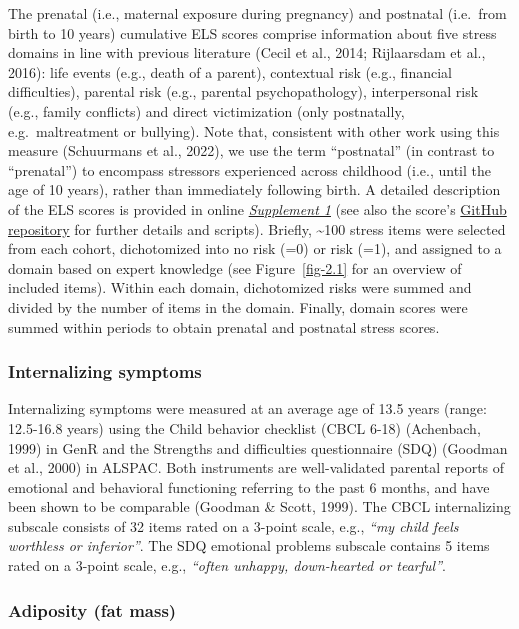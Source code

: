 \documentclass[
  letterpaper,
  DIV=11,
  numbers=noendperiod]{scrreport}
\begin{document}
The prenatal (i.e., maternal exposure during pregnancy) and postnatal
(i.e.~from birth to 10 years) cumulative ELS scores comprise information
about five stress domains in line with previous literature (Cecil et
al., 2014; Rijlaarsdam et al., 2016): life events (e.g., death of a
parent), contextual risk (e.g., financial difficulties), parental risk
(e.g., parental psychopathology), interpersonal risk (e.g., family
conflicts) and direct victimization (only postnatally, e.g.~maltreatment
or bullying). Note that, consistent with other work using this measure
(Schuurmans et al., 2022), we use the term ``postnatal'' (in contrast to
``prenatal'') to encompass stressors experienced across childhood (i.e.,
until the age of 10 years), rather than immediately following birth. A
detailed description of the ELS scores is provided in online
\href{https://osf.io/xs29c}{\emph{Supplement 1}} (see also the score's
\href{https://github.com/SereDef/cumulative-ELS-score}{GitHub
repository} for further details and scripts). Briefly,
\textasciitilde100 stress items were selected from each cohort,
dichotomized into no risk (=0) or risk (=1), and assigned to a domain
based on expert knowledge (see Figure~\ref{fig-2.1} for an overview of
included items). Within each domain, dichotomized risks were summed and
divided by the number of items in the domain. Finally, domain scores
were summed within periods to obtain prenatal and postnatal stress
scores.

\subsubsection{Internalizing symptoms}\label{internalizing-symptoms}

Internalizing symptoms were measured at an average age of 13.5 years
(range: 12.5-16.8 years) using the Child behavior checklist (CBCL 6-18)
(Achenbach, 1999) in GenR and the Strengths and difficulties
questionnaire (SDQ) (Goodman et al., 2000) in ALSPAC. Both instruments
are well-validated parental reports of emotional and behavioral
functioning referring to the past 6 months, and have been shown to be
comparable (Goodman \& Scott, 1999). The CBCL internalizing subscale
consists of 32 items rated on a 3-point scale, e.g., \emph{``my child
feels worthless or inferior''}. The SDQ emotional problems subscale
contains 5 items rated on a 3-point scale, e.g., \emph{``often unhappy,
down-hearted or tearful''}.

\subsubsection{Adiposity (fat mass)}\label{adiposity-fat-mass}
\end{document}
